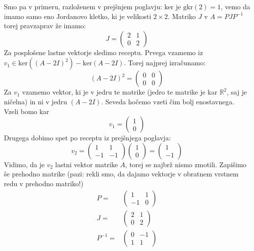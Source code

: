 \documentclass{article}
\begin{document}
\noindent Smo pa v primeru, razloženem v prejšnjem poglavju: ker je $\mathrm{gkr}(2)=1$, vemo da imamo samo eno Jordanovo kletko, ki je velikosti $2 \times 2$. Matriko $J$ v $A = P J P^{-1}$ torej pravzaprav že imamo:
\begin{equation*}
J = \begin{pmatrix}
2 & 1 \\
0 & 2
\end{pmatrix}
\end{equation*}
Za posplošene lastne vektorje sledimo receptu.
Prvega vzamemo iz $v_1 \in \mathrm{ker}((A-2I)^2) - \mathrm{ker}(A-2I)$.
Torej najprej izračunamo:
\begin{equation*}
(A-2I)^2 = \begin{pmatrix}
0 & 0 \\
0 & 0
\end{pmatrix}
\end{equation*}
Za $v_1$ vzamemo vektor, ki je v jedru te matrike (jedro te matrike je kar $\mathbb{R}^2$, saj je ničelna) in ni v jedru $(A-2I)$.
Seveda hočemo vzeti čim bolj enostavnega. Vzeli bomo kar
\begin{equation*}
v_1 = \begin{pmatrix} 1 \\ 0 \end{pmatrix}
\end{equation*}
Drugega dobimo spet po receptu iz prejšnjega poglavja:
\begin{equation*}
v_2 = \begin{pmatrix} 1 & 1 \\ -1 & -1 \end{pmatrix}
\begin{pmatrix} 1 \\ 0 \end{pmatrix} = \begin{pmatrix} 1 \\ -1 \end{pmatrix}
\end{equation*}
Vidimo, da je $v_2$ lastni vektor matrike $A$, torej se najbrž nismo zmotili.
Zapišimo še prehodno matrike (pazi: rekli smo, da dajamo vektorje v obratnem vrstnem redu v prehodno matriko!)
\begin{align*}
P  =&
\begin{pmatrix}
1 & 1 \\
-1  & 0
\end{pmatrix} \\
J =& 
\begin{pmatrix}
2 & 1 \\
0  & 2
\end{pmatrix} \\
P^{-1} =& 
\begin{pmatrix}
0 & -1 \\
1  & 1
\end{pmatrix}
\end{align*}
\end{document}
